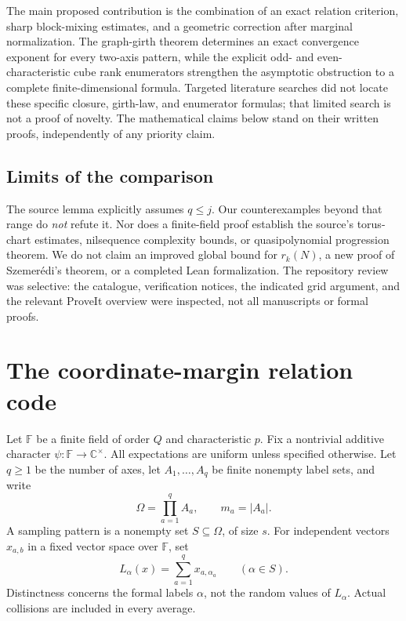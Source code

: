 \documentclass[11pt,a4paper]{article}
\numberwithin{equation}{section}
\theoremstyle{definition}
\theoremstyle{remark}
\newcommand{\F}{\mathbb F}
\newcommand{\1}{\mathbf 1}
\begin{document}
The main proposed contribution is the combination of an exact relation
criterion, sharp block-mixing estimates, and a geometric correction after
marginal normalization. The graph-girth theorem determines an exact convergence exponent for
every two-axis pattern, while the explicit odd- and even-characteristic cube
rank enumerators strengthen the asymptotic obstruction to a complete
finite-dimensional formula. Targeted literature searches did not locate
these specific closure, girth-law, and enumerator formulas; that limited search is
not a proof of novelty. The mathematical claims below stand on their
written proofs, independently of any priority claim.

\subsection{Limits of the comparison}
The source lemma explicitly assumes $q\leq j$. Our counterexamples beyond
that range do \emph{not} refute it. Nor does a finite-field proof establish
the source's torus-chart estimates, nilsequence complexity bounds, or
quasipolynomial progression theorem. We do not claim an improved global
bound for $r_k(N)$, a new proof of Szemer\'edi's theorem, or a completed Lean
formalization. The repository review was selective: the catalogue,
verification notices, the indicated grid argument, and the relevant
ProveIt overview were inspected, not all manuscripts or formal proofs.

\section{The coordinate-margin relation code}
\label{gm:sec:relations}

Let $\F$ be a finite field of order $Q$ and characteristic $p$. Fix a
nontrivial additive character $\psi:\F\to\mathbb C^\times$. All expectations
are uniform unless specified otherwise. Let $q\geq1$ be the number of axes,
let $A_1,\ldots,A_q$ be finite nonempty label sets, and write
\[
 \Omega=\prod_{a=1}^q A_a,\qquad m_a=|A_a|.
\]
A sampling pattern is a nonempty set $S\subseteq\Omega$, of size $s$.
For independent vectors $x_{a,b}$ in a fixed vector space over $\F$, set
\begin{equation}\label{gm:eq:site-form}
 L_\alpha(x)=\sum_{a=1}^q x_{a,\alpha_a}\qquad(\alpha\in S).
\end{equation}
Distinctness concerns the formal labels $\alpha$, not the random values of
$L_\alpha$. Actual collisions are included in every average.
\end{document}
